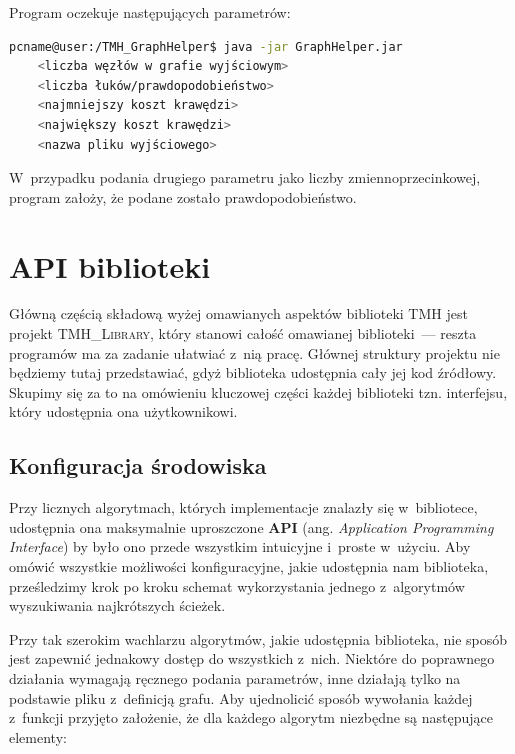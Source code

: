 Program oczekuje następujących parametrów:

\begin{lstlisting}[language=bash]
pcname@user:/TMH_GraphHelper$ java -jar GraphHelper.jar
	<liczba węzłów w grafie wyjściowym>
	<liczba łuków/prawdopodobieństwo>
	<najmniejszy koszt krawędzi>
	<największy koszt krawędzi>
	<nazwa pliku wyjściowego>
\end{lstlisting}

W~przypadku podania drugiego parametru jako liczby zmiennoprzecinkowej, program założy, że podane zostało prawdopodobieństwo.




\section{API biblioteki}




Główną częścią składową wyżej omawianych aspektów biblioteki \textsc{TMH} jest projekt \textsc{TMH\_Library}, który stanowi całość omawianej biblioteki~--- reszta programów ma za zadanie ułatwiać z~nią pracę.
Głównej struktury projektu nie będziemy tutaj przedstawiać, gdyż biblioteka udostępnia cały jej kod źródłowy.
Skupimy się za to na omówieniu kluczowej części każdej biblioteki tzn. interfejsu, który udostępnia ona użytkownikowi.



\subsection{Konfiguracja środowiska}



Przy licznych algorytmach, których implementacje znalazły się w~bibliotece, udostępnia ona maksymalnie uproszczone \textbf{API} (ang. \textit{Application Programming Interface}) by było ono przede wszystkim intuicyjne i~proste w~użyciu.
Aby omówić wszystkie możliwości konfiguracyjne, jakie udostępnia nam biblioteka, prześledzimy krok po kroku schemat wykorzystania jednego z~algorytmów wyszukiwania najkrótszych ścieżek.

Przy tak szerokim wachlarzu algorytmów, jakie udostępnia biblioteka, nie sposób jest zapewnić jednakowy dostęp do wszystkich z~nich.
Niektóre do poprawnego działania wymagają ręcznego podania parametrów, inne działają tylko na podstawie pliku z~definicją grafu.
Aby ujednolicić sposób wywołania każdej z~funkcji przyjęto założenie, że dla każdego algorytm niezbędne są następujące elementy:

